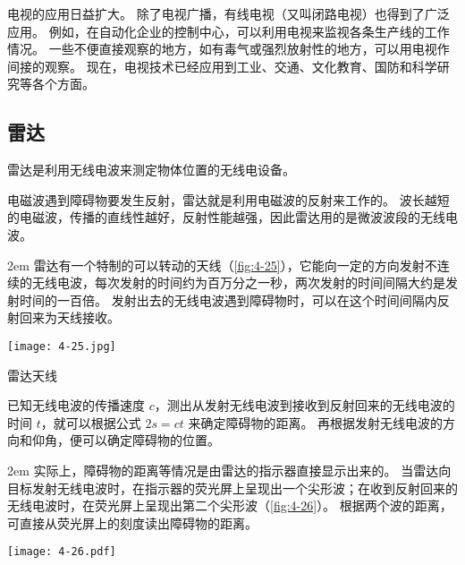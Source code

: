 电视的应用日益扩大。
除了电视广播，有线电视（又叫闭路电视）也得到了广泛应用。
例如，在自动化企业的控制中心，可以利用电视来监视各条生产线的工作情况。
一些不便直接观察的地方，如有毒气或强烈放射性的地方，可以用电视作间接的观察。
现在，电视技术已经应用到工业、交通、文化教育、国防和科学研究等各个方面。

\subsection{雷达}

雷达是利用无线电波来测定物体位置的无线电设备。

电磁波遇到障碍物要发生反射，雷达就是利用电磁波的反射来工作的。
波长越短的电磁波，传播的直线性越好，反射性能越强，因此雷达用的是微波波段的无线电波。

\medskip\noindent
\begin{minipage}{0.42\linewidth}\parindent2em
	雷达有一个特制的可以转动的天线（\cref{fig:4-25}），它能向一定的方向发射不连续的无线电波，每次发射的时间约为百万分之一秒，两次发射的时间间隔大约是发射时间的一百倍。
	发射出去的无线电波遇到障碍物时，可以在这个时间间隔内反射回来为天线接收。
\end{minipage}\hfill
\begin{minipage}{0.56\linewidth}\centering
	\begin{figurehere}
		\texttt{[image: 4-25.jpg]}
		\caption{雷达天线}\label{fig:4-25}
	\end{figurehere}
\end{minipage}

\medskip
已知无线电波的传播速度 $c$，测出从发射无线电波到接收到反射回来的无线电波的时间 $t$，就可以根据公式 $2s=ct$ 来确定障碍物的距离。
再根据发射无线电波的方向和仰角，便可以确定障碍物的位置。

\medskip\noindent
\begin{minipage}{0.65\linewidth}\parindent2em
	实际上，障碍物的距离等情况是由雷达的指示器直接显示出来的。
	当雷达向目标发射无线电波时，在指示器的荧光屏上呈现出一个尖形波；在收到反射回来的无线电波时，在荧光屏上呈现出第二个尖形波（\cref{fig:4-26}）。
	根据两个波的距离，可直接从荧光屏上的刻度读出障碍物的距离。
\end{minipage}\hfill
\begin{minipage}{0.3\linewidth}\centering
	\begin{figurehere}
		\texttt{[image: 4-26.pdf]}
		\caption{}\label{fig:4-26}
	\end{figurehere}
\end{minipage}

